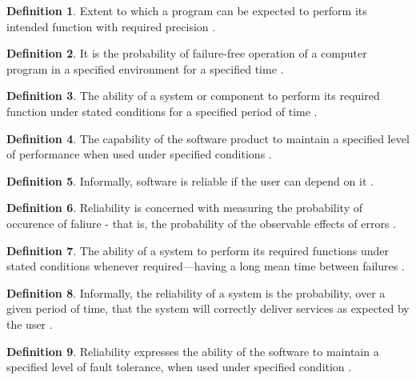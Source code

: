 \documentclass[letterpaper, cleveref]{lipics-v2019}
\theoremstyle{definition}
\newtheorem{defn}{Definition}
\begin{document}
\begin{defn}
  Extent to which a program can be expected to perform its intended function
  with required precision \citep{McCallEtAl1977}.
\end{defn}

\begin{defn} \label{reliabilitySelected1} It is the probability of failure-free
  operation of a computer program in a specified environment for a specified
  time \citep{musa1987software}.
\end{defn}

\begin{defn}
  The ability of a system or component to perform its required function under
  stated conditions for a specified period of time
  \citep{IEEEComputerDictionary1991}.
\end{defn}

\begin{defn}
 The capability of the software product to maintain a specified level of
 performance when used under specified conditions \cite{ISO9126}. %
\end{defn}

\begin{defn}
  Informally, software is reliable if the user can depend on it
  \citep{GhezziEtAl2003}.
\end{defn}

\begin{defn} \label{reliabilitySelected2} Reliability is concerned with measuring
	the probability of occurence of faliure - that is, the probability of the
	observable effects of errors \citep{GhezziEtAl2003}.
\end{defn}

\begin{defn}
  The ability of a system to perform its required functions under stated
  conditions whenever required—having a long mean time between failures
  \citep{mcconnell2004code}.
\end{defn}

\begin{defn}
  Informally, the reliability of a system is the probability, over a given
  period of time, that the system will correctly deliver services as expected by
  the user \citep{sommerville}. %
\end{defn}

\begin{defn}
  Reliability expresses the ability of the software to maintain a specified
  level of fault tolerance, when used under specified condition
  \citep{singh2013different}.
\end{defn}
\end{document}
